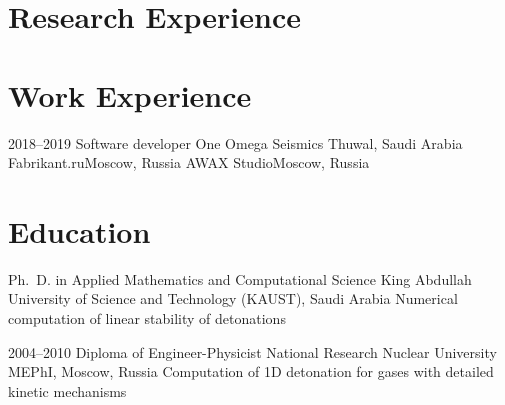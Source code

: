 \documentclass[11pt,a4paper,sans]{moderncv}
\begin{document}
\makecvtitle%


\section{Research Experience}



\section{Work Experience}

\cventry
{2018--2019}
{Software developer}
{One Omega Seismics}
{Thuwal, Saudi Arabia}
{}
{}
{Fabrikant.ru}{Moscow, Russia}{}{}
{AWAX Studio}{Moscow, Russia}{}{}


\section{Education}

        {Ph.\ D. in Applied Mathematics and Computational Science}
        {King Abdullah University of Science and Technology (KAUST), Saudi
          Arabia}
        {}{}{}
       {Numerical computation of linear stability of detonations}

\cventry
  {2004--2010}
  {Diploma of Engineer-Physicist}
  {National Research Nuclear University MEPhI, Moscow, Russia}{}{}{}
       {Computation of 1D detonation for
        gases with detailed kinetic mechanisms}
\end{document}
